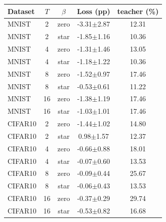 \begin{tabular}{lcccc}\hline
Dataset & $T$ & $\beta$ & Loss (pp) & teacher (\%) \\\hline
MNIST & 2 & zero & -3.31$\pm$2.87 & 12.31 \\
MNIST & 2 & star & -1.85$\pm$1.16 & 10.36 \\
MNIST & 4 & zero & -1.31$\pm$1.46 & 13.05 \\
MNIST & 4 & star & -1.18$\pm$1.22 & 10.36 \\
MNIST & 8 & zero & -1.52$\pm$0.97 & 17.46 \\
MNIST & 8 & star & -0.53$\pm$0.61 & 11.22 \\
MNIST & 16 & zero & -1.38$\pm$1.19 & 17.46 \\
MNIST & 16 & star & -1.03$\pm$1.01 & 17.46 \\
CIFAR10 & 2 & zero & -1.44$\pm$1.02 & 14.80 \\
CIFAR10 & 2 & star & 0.98$\pm$1.57 & 12.37 \\
CIFAR10 & 4 & zero & -0.66$\pm$0.88 & 18.01 \\
CIFAR10 & 4 & star & -0.07$\pm$0.60 & 13.53 \\
CIFAR10 & 8 & zero & -0.09$\pm$0.44 & 25.67 \\
CIFAR10 & 8 & star & -0.06$\pm$0.43 & 13.53 \\
CIFAR10 & 16 & zero & -0.37$\pm$0.29 & 29.74 \\
CIFAR10 & 16 & star & -0.53$\pm$0.82 & 16.68 \\
\hline\end{tabular}
